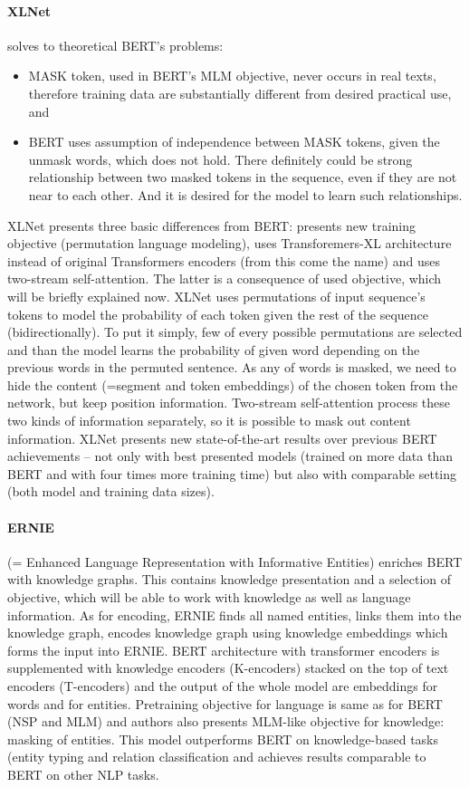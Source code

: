 \paragraph{XLNet} \citep{Yang2019a} solves to theoretical BERT's problems:
\begin{itemize}
\item MASK token, used in BERT's MLM objective, never occurs in real texts, therefore training data are substantially different from desired practical use, and
\item BERT uses assumption of independence between MASK tokens, given the unmask words, which does not hold. There definitely could be strong relationship between two masked tokens in the sequence, even if they are not near to each other. And it is desired for the model to learn such relationships.
\end{itemize}
XLNet presents three basic differences from BERT: presents new training objective (permutation language modeling), uses Transforemers-XL \citep{Dai2019} architecture instead of original Transformers encoders (from this come the name) and uses two-stream self-attention. The latter is a consequence of used objective, which will be briefly explained now. XLNet uses permutations of input sequence's tokens to model the probability of each token given the rest of the sequence (bidirectionally). To put it simply, few of every possible permutations are selected and than the model learns the probability of given word depending on the previous words in the permuted sentence. As any of words is masked, we need to hide the content (=segment and token embeddings) of the chosen token from the network, but keep position information. Two-stream self-attention process these two kinds of information separately, so it is possible to mask out content information. XLNet presents new state-of-the-art results over previous BERT achievements -- not only with best presented models (trained on more data than BERT and with four times more training time) but also with comparable setting (both model and training data sizes).
\paragraph{ERNIE} (= Enhanced Language Representation with Informative Entities) \citep{Zhang2019} enriches BERT with knowledge graphs. This contains knowledge presentation and a selection of objective, which will be able to work with knowledge as well as language information. As for encoding, ERNIE finds all named entities, links them into the knowledge graph, encodes knowledge graph using knowledge embeddings %
which forms the input into ERNIE. BERT architecture with transformer encoders is supplemented with knowledge encoders (K-encoders) stacked on the top of text encoders (T-encoders) and the output of the whole model are embeddings for words and for entities. Pretraining objective for language is same as for BERT (NSP and MLM) and authors also presents MLM-like objective for knowledge: masking of entities. This model outperforms BERT on knowledge-based tasks (entity typing and relation classification and achieves results comparable to BERT on other NLP tasks.


